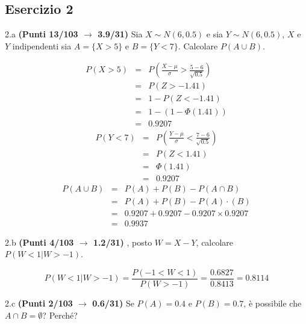 \documentclass[
  11pt,
]{book}
\theoremstyle{mytheoremstyle}
\theoremstyle{mydefstyle}
\newenvironment{sol}
  {
  \begin{tcolorbox}[enhanced,breakable,arc=0.1mm,boxrule=1pt,colback=white,colframe=iblue,
  title=\bf \fontfamily{lmss}\selectfont \hspace{.5 cm} Soluzione,drop fuzzy shadow]

}{
\end{tcolorbox}
  }
\begin{document}
\subsection{Esercizio 2}\label{esercizio-2-39}

2.a \textbf{(Punti 13/103 \(\rightarrow\) 3.9/31)} Sia \(X\sim N(6,0.5)\) e sia \(Y\sim N(6,0.5)\), \(X\) e \(Y\) indipendenti sia \(A=\{X>5\}\) e \(B=\{Y<7\}\).
Calcolare \(P(A\cup B)\).

\begin{sol}
\begin{eqnarray*}
      P( X   >   5 ) 
        &=& P\left(  \frac { X  -  \mu }{ \sigma }  >  \frac { 5  -  6 }{\sqrt{ 0.5 }} \right)  \\
                 &=& P\left(  Z   >   -1.41 \right) \\    &=& 1-P(Z< -1.41 )\\ 
                 &=&  1-(1-\Phi( 1.41 )) \\ &=&  0.9207 
      \end{eqnarray*}\begin{eqnarray*}
      P( Y   <   7 ) 
        &=& P\left(  \frac { Y  -  \mu }{ \sigma }  <  \frac { 7  -  6 }{\sqrt{ 0.5 }} \right)  \\
                 &=& P\left(  Z   <   1.41 \right) \\    
                 &=&  \Phi( 1.41 ) \\ &=&  0.9207 
      \end{eqnarray*}\begin{eqnarray}
      P( A \cup B ) &=& P( A )+P( B )-P( A \cap B ) \\
                         &=& P( A )+P( B )-P( A )\cdot ( B ) \\
                         &=&  0.9207 + 0.9207 - 0.9207 \times 0.9207  \\
                         &=&  0.9937 \end{eqnarray}

\end{sol}

2.b \textbf{(Punti 4/103 \(\rightarrow\) 1.2/31)} , posto \(W=X-Y\), calcolare \(P(W<1|W>-1)\).

\begin{sol}
\[ 
P(W<1|W>-1)=\frac{P(-1<W<1)}{P(W>-1)}=\frac{0.6827}{0.8413}=0.8114
\]

\end{sol}

2.c \textbf{(Punti 2/103 \(\rightarrow\) 0.6/31)} Se \(P(A)=0.4\) e \(P(B)=0.7\), è possibile che \(A\cap B=\emptyset\)? Perché?
\end{document}
